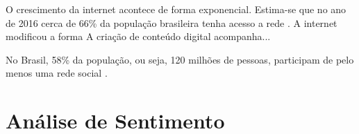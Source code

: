 O crescimento da internet acontece de forma exponencial. Estima-se que no ano de 2016 cerca de 66\% da população brasileira tenha acesso a rede \cite{social17}. A internet modificou a forma
A criação de conteúdo digital acompanha...

No Brasil, 58\% da população, ou seja, 120 milhões de pessoas, participam de pelo menos uma rede social \cite{social17}.



\section{Análise de Sentimento}
